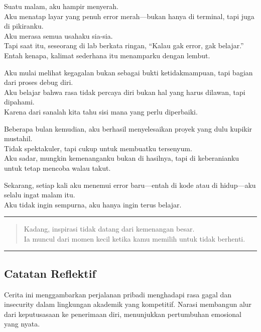 \documentclass[
  letterpaper,
  DIV=11,
  numbers=noendperiod]{scrreprt}
\begin{document}
Suatu malam, aku hampir menyerah.\\
Aku menatap layar yang penuh error merah---bukan hanya di terminal, tapi
juga di pikiranku.\\
Aku merasa semua usahaku sia-sia.\\
Tapi saat itu, seseorang di lab berkata ringan, ``Kalau gak error, gak
belajar.''\\
Entah kenapa, kalimat sederhana itu menamparku dengan lembut.

Aku mulai melihat kegagalan bukan sebagai bukti ketidakmampuan, tapi
bagian dari proses debug diri.\\
Aku belajar bahwa rasa tidak percaya diri bukan hal yang harus dilawan,
tapi dipahami.\\
Karena dari sanalah kita tahu sisi mana yang perlu diperbaiki.

Beberapa bulan kemudian, aku berhasil menyelesaikan proyek yang dulu
kupikir mustahil.\\
Tidak spektakuler, tapi cukup untuk membuatku tersenyum.\\
Aku sadar, mungkin kemenanganku bukan di hasilnya, tapi di keberanianku
untuk tetap mencoba walau takut.

Sekarang, setiap kali aku menemui error baru---entah di kode atau di
hidup---aku selalu ingat malam itu.\\
Aku tidak ingin sempurna, aku hanya ingin terus belajar.

\begin{center}\rule{0.5\linewidth}{0.5pt}\end{center}

\begin{quote}
Kadang, inspirasi tidak datang dari kemenangan besar.\\
Ia muncul dari momen kecil ketika kamu memilih untuk tidak berhenti.
\end{quote}

\begin{center}\rule{0.5\linewidth}{0.5pt}\end{center}

\subsection{Catatan Reflektif}\label{catatan-reflektif-1}

Cerita ini menggambarkan perjalanan pribadi menghadapi rasa gagal dan
insecurity dalam lingkungan akademik yang kompetitif. Narasi membangun
alur dari keputusasaan ke penerimaan diri, menunjukkan pertumbuhan
emosional yang nyata.
\end{document}
